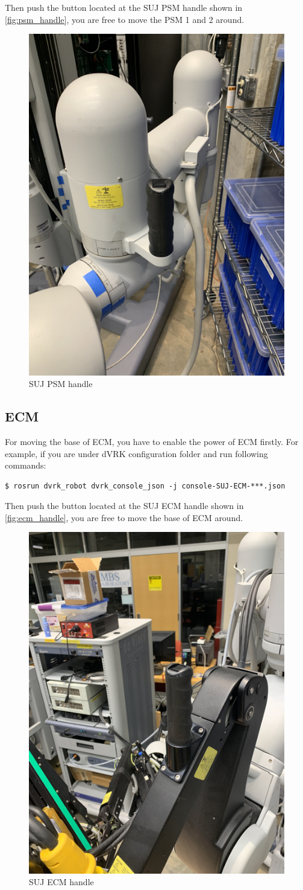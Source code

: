 Then push the button located at the SUJ PSM handle shown in \autoref{fig:psm_handle}, you are free to move the PSM 1 and 2 around.

\begin{figure}[H]
    \centering
    \includegraphics[width=0.4\linewidth]{figures/PSM_handle.png}
    \caption{SUJ PSM handle}
    \label{fig:psm_handle}
\end{figure}

\subsection{ECM}

For moving the base of ECM, you have to enable the power of ECM firstly. For example, if you are under dVRK configuration folder and run following commands: 

\begin{verbatim}
$ rosrun dvrk_robot dvrk_console_json -j console-SUJ-ECM-***.json
\end{verbatim}

Then push the button located at the SUJ ECM handle shown in \autoref{fig:ecm_handle}, you are free to move the base of ECM around.

\begin{figure}[H]
    \centering
    \includegraphics[width=0.6\linewidth]{figures/ECM_handle.png}
    \caption{SUJ ECM handle}
    \label{fig:ecm_handle}
\end{figure}



